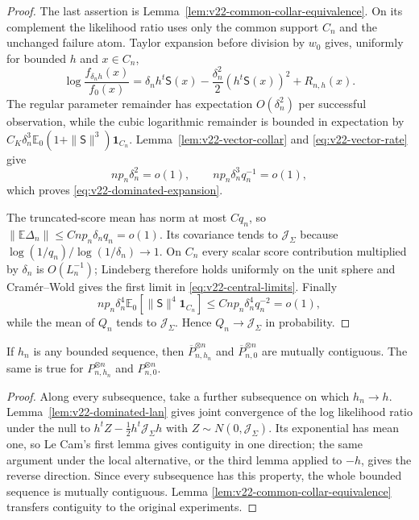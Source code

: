 \begin{proof}
The last assertion is Lemma~\ref{lem:v22-common-collar-equivalence}.  On its
complement the likelihood ratio uses only the common support $C_n$ and the
unchanged failure atom.  Taylor expansion before division by $w_0$ gives,
uniformly for bounded $h$ and $x\in C_n$,
\[
 \log\frac{f_{\delta_nh}(x)}{f_0(x)}
 =\delta_nh^t\mathsf S(x)
 -\frac{\delta_n^2}{2}(h^t\mathsf S(x))^2+R_{n,h}(x).
\]
The regular parameter remainder has expectation $O(\delta_n^2)$ per
successful observation, while the cubic logarithmic remainder is bounded in
expectation by
$C_K\delta_n^3\mathbb E_0(1+\|\mathsf S\|^3)\mathbf1_{C_n}$.
Lemma~\ref{lem:v22-vector-collar} and \eqref{eq:v22-vector-rate} give
\[
 np_n\delta_n^2=o(1),\qquad
 np_n\delta_n^3q_n^{-1}=o(1),
\]
which proves \eqref{eq:v22-dominated-expansion}.

The truncated-score mean has norm at most $Cq_n$, so
$\|\mathbb E\Delta_n\|\le Cnp_n\delta_nq_n=o(1)$.  Its covariance tends to
$\mathcal J_\Sigma$ because
$\log(1/q_n)/\log(1/\delta_n)\to1$.  On $C_n$ every scalar score contribution
multiplied by $\delta_n$ is $O(L_n^{-1})$; Lindeberg therefore holds uniformly
on the unit sphere and Cram\'er--Wold gives the first limit in
\eqref{eq:v22-central-limits}.  Finally
\[
 np_n\delta_n^4
 \mathbb E_0[\|\mathsf S\|^4\mathbf1_{C_n}]
 \le Cnp_n\delta_n^4q_n^{-2}=o(1),
\]
while the mean of $Q_n$ tends to $\mathcal J_\Sigma$.  Hence
$Q_n\to\mathcal J_\Sigma$ in probability.
\end{proof}

\begin{lemma}
\label{lem:v22-contiguity}
If $h_n$ is any bounded sequence, then
$\overline P_{n,h_n}^{\otimes n}$ and
$\overline P_{n,0}^{\otimes n}$ are mutually contiguous.  The same is true
for $P_{n,h_n}^{\otimes n}$ and $P_{n,0}^{\otimes n}$.
\end{lemma}

\begin{proof}
Along every subsequence, take a further subsequence on which $h_n\to h$.
Lemma~\ref{lem:v22-dominated-lan} gives joint convergence of the log
likelihood ratio under the null to
$h^tZ-\frac12h^t\mathcal J_\Sigma h$ with
$Z\sim N(0,\mathcal J_\Sigma)$.  Its exponential has mean one, so Le Cam's
first lemma gives contiguity in one direction; the same argument under the
local alternative, or the third lemma applied to $-h$, gives the reverse
direction.  Since every subsequence has this property, the whole bounded
sequence is mutually contiguous.  Lemma
\ref{lem:v22-common-collar-equivalence} transfers contiguity to the original
experiments.
\end{proof}

